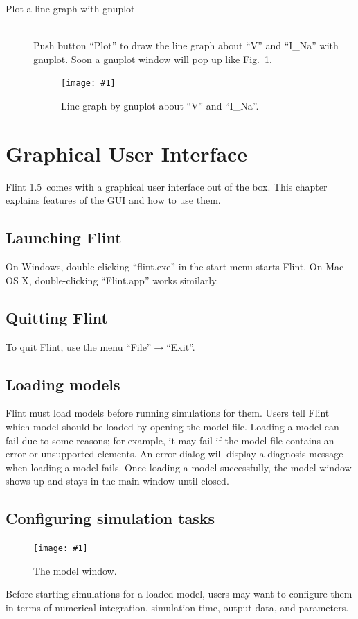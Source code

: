 \documentclass[a4paper,10pt]{report}
\def\FlintVersion{1.5}
\def\Flint{Flint \FlintVersion}
\newcommand\FigureOfImage[2]{\begin{figure}[h]
  \centering
  \texttt{[image: \#1]}
  \caption{#2}\label{fig:#1}
\end{figure}}
\begin{document}
\begin{description}
\item[Plot a line graph with gnuplot] \hfill \\
Push button ``Plot'' to draw the line graph about ``V'' and ``I\_Na'' with
gnuplot. Soon a gnuplot window will pop up like Fig.~\ref{fig:hh-gnuplot}.
\FigureOfImage{hh-gnuplot}{Line graph by gnuplot about ``V'' and ``I\_Na''.}
\end{description}



\chapter{Graphical User Interface}
\Flint\ comes with a graphical user interface out of the box. This chapter
explains features of the GUI and how to use them.

\section{Launching Flint}
On Windows, double-clicking ``flint.exe'' in the start menu starts Flint.
On Mac OS X, double-clicking ``Flint.app'' works similarly.

\section{Quitting Flint}
To quit Flint, use the menu ``File''$\rightarrow$``Exit''.

\section{Loading models}
Flint must load models before running simulations for them.
Users tell Flint which model should be loaded by opening the model file.
Loading a model can fail due to some reasons; for example, it may fail if
the model file contains an error or unsupported elements.
An error dialog will display a diagnosis message when loading a model fails.
Once loading a model successfully, the model window shows up and stays
in the main window until closed.

\section{Configuring simulation tasks}
\FigureOfImage{lr}{The model window.}
Before starting simulations for a loaded model, users may want to configure them
in terms of numerical integration, simulation time, output data, and parameters.
\end{document}
